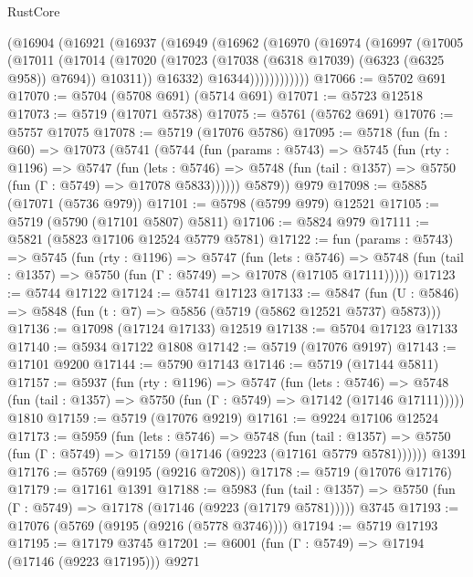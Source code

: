 \begin{lexlean}{RustCore}
\begin{coremodule}
          (@16904
            (@16921
              (@16937
                (@16949
                  (@16962
                    (@16970
                      (@16974
                        (@16997
                          (@17005
                            (@17011
                              (@17014
                                (@17020
                                  (@17023 (@17038 (@6318 @17039) (@6323 (@6325 @958)) @7694))
                                  @10311))
                              @16332)
                            @16344))))))))))))
@17066 := @5702 @691
@17070 := @5704 (@5708 @691) (@5714 @691)
@17071 := @5723 @12518
@17073 := @5719 (@17071 @5738)
@17075 := @5761 (@5762 @691)
@17076 := @5757 @17075
@17078 := @5719 (@17076 @5786)
@17095 := @5718
    (fun (fn : @60) =>
    @17073
      (@5741
        (@5744
          (fun (params : @5743) =>
          @5745
            (fun (rty : @1196) =>
            @5747
              (fun (lets : @5746) =>
              @5748 (fun (tail : @1357) => @5750 (fun (Γ : @5749) => @17078 @5833))))))
        @5879))
    @979
@17098 := @5885 (@17071 (@5736 @979))
@17101 := @5798 (@5799 @979) @12521
@17105 := @5719 (@5790 (@17101 @5807) @5811)
@17106 := @5824 @979
@17111 := @5821 (@5823 @17106 @12524 @5779 @5781)
@17122 := fun (params : @5743) =>
  @5745
    (fun (rty : @1196) =>
    @5747
      (fun (lets : @5746) =>
      @5748 (fun (tail : @1357) => @5750 (fun (Γ : @5749) => @17078 (@17105 @17111)))))
@17123 := @5744 @17122
@17124 := @5741 @17123
@17133 := @5847
    (fun (U : @5846) => @5848 (fun (t : @7) => @5856 (@5719 (@5862 @12521 @5737) @5873)))
@17136 := @17098 (@17124 @17133) @12519
@17138 := @5704 @17123 @17133
@17140 := @5934 @17122 @1808
@17142 := @5719 (@17076 @9197)
@17143 := @17101 @9200
@17144 := @5790 @17143
@17146 := @5719 (@17144 @5811)
@17157 := @5937
    (fun (rty : @1196) =>
    @5747
      (fun (lets : @5746) =>
      @5748 (fun (tail : @1357) => @5750 (fun (Γ : @5749) => @17142 (@17146 @17111)))))
    @1810
@17159 := @5719 (@17076 @9219)
@17161 := @9224 @17106 @12524
@17173 := @5959
    (fun (lets : @5746) =>
    @5748
      (fun (tail : @1357) =>
      @5750 (fun (Γ : @5749) => @17159 (@17146 (@9223 (@17161 @5779 @5781))))))
    @1391
@17176 := @5769 (@9195 (@9216 @7208))
@17178 := @5719 (@17076 @17176)
@17179 := @17161 @1391
@17188 := @5983
    (fun (tail : @1357) => @5750 (fun (Γ : @5749) => @17178 (@17146 (@9223 (@17179 @5781)))))
    @3745
@17193 := @17076 (@5769 (@9195 (@9216 (@5778 @3746))))
@17194 := @5719 @17193
@17195 := @17179 @3745
@17201 := @6001 (fun (Γ : @5749) => @17194 (@17146 (@9223 @17195))) @9271

\end{coremodule}
\end{lexlean}
